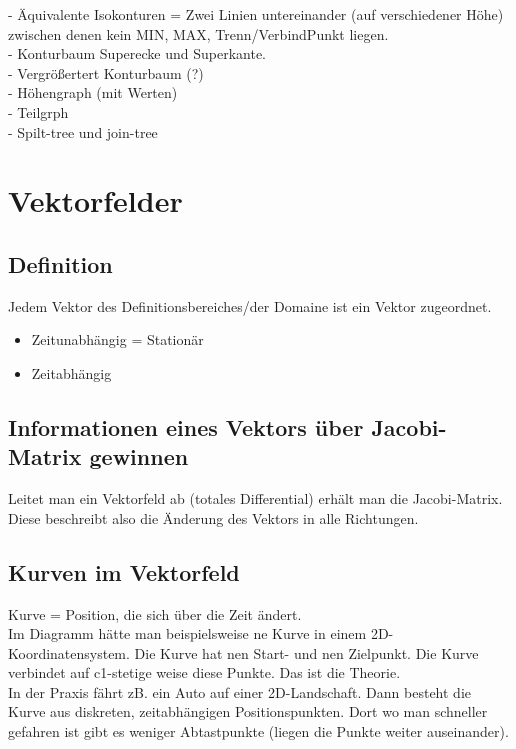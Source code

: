 \documentclass{article}
\begin{document}
- Äquivalente Isokonturen = Zwei Linien untereinander (auf verschiedener Höhe) zwischen denen kein MIN, MAX, Trenn/VerbindPunkt liegen.\\

- Konturbaum Superecke und Superkante.\\

- Vergrößertert Konturbaum (?)\\
- Höhengraph (mit Werten)\\
- Teilgrph\\
- Spilt-tree und join-tree\\


\pagebreak
\section{Vektorfelder}
\subsection{Definition}
Jedem Vektor des Definitionsbereiches/der Domaine ist ein Vektor zugeordnet.

\begin{itemize}[noitemsep]
	\item Zeitunabhängig = Stationär	
	\item Zeitabhängig
\end{itemize}

\subsection{Informationen eines Vektors über Jacobi-Matrix gewinnen}
Leitet man ein Vektorfeld ab (totales Differential) erhält man die Jacobi-Matrix. Diese beschreibt also die Änderung des Vektors in alle Richtungen.\\

\subsection{Kurven im Vektorfeld}
Kurve = Position, die sich über die Zeit ändert.\\
Im Diagramm hätte man beispielsweise ne Kurve in einem 2D-Koordinatensystem. Die Kurve hat nen Start- und nen Zielpunkt. Die Kurve verbindet auf c1-stetige weise diese Punkte. Das ist die Theorie.\\

\noindent In der Praxis fährt zB. ein Auto auf einer 2D-Landschaft. Dann besteht die Kurve aus diskreten, zeitabhängigen Positionspunkten. Dort wo man schneller gefahren ist gibt es weniger Abtastpunkte (liegen die Punkte weiter auseinander). \\
\end{document}
